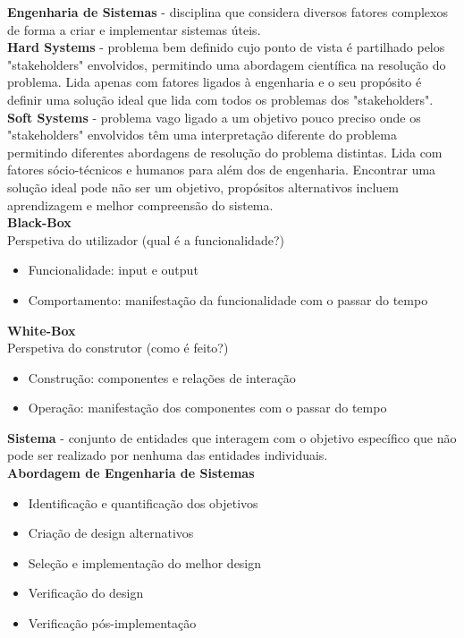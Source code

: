 \documentclass[12pt]{article}
\begin{document}
\textbf{Engenharia de Sistemas} - disciplina que considera diversos fatores complexos de forma a criar e implementar sistemas úteis.
\\[6pt]
\textbf{Hard Systems} - problema bem definido cujo ponto de vista é partilhado pelos "stakeholders" envolvidos, permitindo uma abordagem científica na resolução do problema. Lida apenas com fatores ligados à engenharia e o seu propósito é definir uma solução ideal que lida com todos os problemas dos "stakeholders". 
\\[6pt]
\textbf{Soft Systems} - problema vago ligado a um objetivo pouco preciso onde os "stakeholders" envolvidos têm uma interpretação diferente do problema permitindo diferentes abordagens de resolução do problema distintas. Lida com fatores sócio-técnicos e humanos para além dos de engenharia. Encontrar uma solução ideal pode não ser um objetivo, propósitos alternativos incluem aprendizagem e melhor compreensão do sistema.
\\[6pt]
\textbf{Black-Box} \\
Perspetiva do utilizador (qual é a funcionalidade?)
\begin{itemize}[topsep=0pt, itemsep=0pt]
    \item Funcionalidade: input e output
    \item Comportamento: manifestação da funcionalidade com o passar do tempo
\end{itemize} 
\vspace{6pt}
\textbf{White-Box} \\ 
Perspetiva do construtor (como é feito?)
\begin{itemize}[topsep=0pt, itemsep=0pt]
    \item Construção: componentes e relações de interação
    \item Operação: manifestação dos componentes com o passar do tempo
\end{itemize}
\vspace{6pt}
\textbf{Sistema} - conjunto de entidades que interagem com o objetivo específico que não pode ser realizado por nenhuma das entidades individuais.
\\[6pt]
\textbf{Abordagem de Engenharia de Sistemas}
\begin{itemize}[topsep=0pt, itemsep=0pt]
    \item Identificação e quantificação dos objetivos
    \item Criação de design alternativos
    \item Seleção e implementação do melhor design
    \item Verificação do design
    \item Verificação pós-implementação
\end{itemize}
\end{document}
